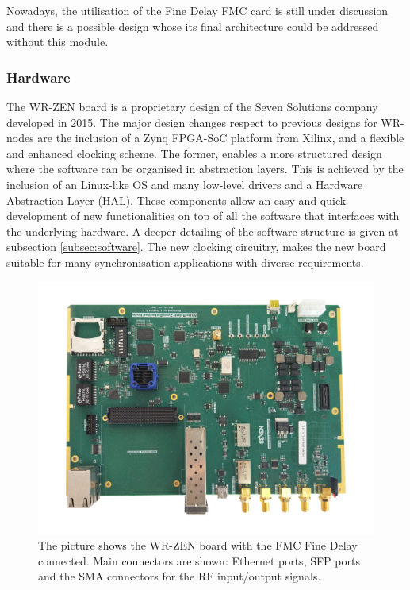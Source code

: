 Nowadays, the utilisation of the Fine Delay FMC card is still under discussion
and there is a possible design whose its final architecture could be addressed
without this module.

\subsubsection{Hardware} \label{subsec:hardware}

The WR-ZEN board is a proprietary design of the Seven Solutions company
developed in 2015. The major design changes respect to previous designs for
WR-nodes are the inclusion of a Zynq FPGA-SoC platform from Xilinx, and a
flexible and enhanced clocking scheme. The former, enables a more structured
design where the software can be organised in abstraction layers. This is
achieved by the inclusion of an Linux-like OS and many low-level drivers and a
Hardware Abstraction Layer (HAL). These components allow an easy and quick
development of new functionalities on top of all the software that interfaces
with the underlying hardware. A deeper detailing of the software structure is
given at subsection \ref{subsec:software}. The new clocking circuitry, makes
the new board suitable for many synchronisation applications with diverse
requirements.

\begin{figure}[H] \centering
	\includegraphics[width=0.7\linewidth]{img/wrzenv3_scaled}
	\caption[WR-ZEN board picture]{The picture shows the WR-ZEN board with
	the FMC Fine Delay connected. Main connectors are shown: Ethernet
	ports, SFP ports and the SMA connectors for the RF input/output
signals.} \label{fig:wrzen} \end{figure}

